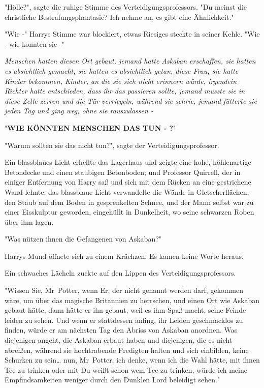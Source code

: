 {"Hölle?", sagte die ruhige Stimme des Verteidigungsprofessors. "Du meinst die christliche Bestrafungsphantasie? Ich nehme an, es gibt eine Ähnlichkeit."

"Wie -" Harrys Stimme war blockiert, etwas Riesiges steckte in seiner Kehle. "Wie - wie konnten sie -"

\emph{Menschen hatten diesen Ort gebaut, jemand hatte Askaban erschaffen, sie hatten es absichtlich gemacht, sie hatten es absichtlich getan, diese Frau, sie hatte Kinder bekommen, Kinder, an die sie sich nicht erinnern würde, irgendein Richter hatte} \emph{entschieden, dass ihr das passieren sollte, jemand musste sie in diese Zelle zerren und die Tür verriegeln, während sie schrie, jemand fütterte sie} \emph{jeden Tag und ging weg, ohne sie rauszulassen -}

"\textbf{WIE KÖNNTEN MENSCHEN DAS TUN - ?}"

"Warum sollten sie das nicht tun?", sagte der Verteidigungsprofessor.

Ein blassblaues Licht erhellte das Lagerhaus und zeigte eine hohe, höhlenartige Betondecke und einen staubigen Betonboden; und Professor Quirrell, der in einiger Entfernung von Harry saß und sich mit dem Rücken an eine gestrichene Wand lehnte; das blassblaue Licht verwandelte die Wände in Gletscherflächen, den Staub auf dem Boden in gesprenkelten Schnee, und der Mann selbst war zu einer Eisskulptur geworden, eingehüllt in Dunkelheit, wo seine schwarzen Roben über ihm lagen.

"Was nützen ihnen die Gefangenen von Askaban?"

Harrys Mund öffnete sich zu einem Krächzen. Es kamen keine Worte heraus.

Ein schwaches Lächeln zuckte auf den Lippen des Verteidigungsprofessors.

"Wissen Sie, Mr~Potter, wenn Er, der nicht genannt werden darf, gekommen wäre, um über das magische Britannien zu herrschen, und einen Ort wie Askaban gebaut hätte, dann hätte er ihn gebaut, weil es ihm Spaß macht, seine Feinde leiden zu sehen. Und wenn er stattdessen anfing, ihr Leiden geschmacklos zu finden, würde er am nächsten Tag den Abriss von Askaban anordnen. Was diejenigen angeht, die Askaban erbaut haben und diejenigen, die es nicht abreißen, während sie hochtrabende Predigten halten und sich einbilden, keine Schurken zu sein… nun, Mr~Potter, ich denke, wenn ich die Wahl hätte, mit ihnen Tee zu trinken oder mit Du-weißt-schon-wem Tee zu trinken, würde ich meine Empfindsamkeiten weniger durch den Dunklen Lord beleidigt sehen."

}
